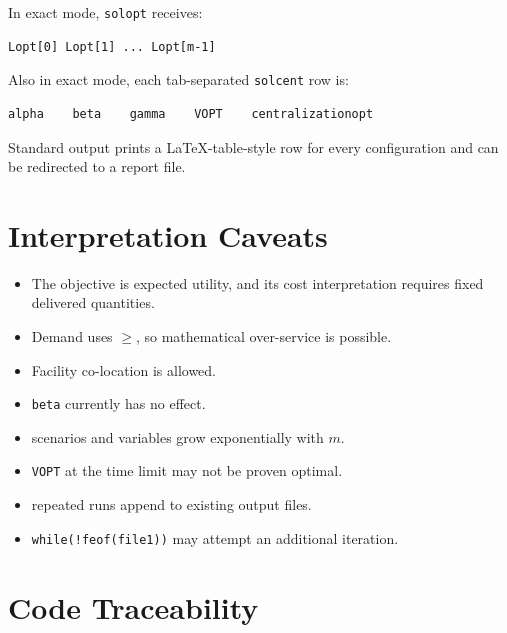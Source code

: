 \documentclass[11pt,a4paper]{article}
\newcommand{\code}[1]{\texttt{#1}}
\begin{document}
In exact mode, \code{solopt} receives:
\begin{lstlisting}
Lopt[0] Lopt[1] ... Lopt[m-1]
\end{lstlisting}

Also in exact mode, each tab-separated \code{solcent} row is:
\begin{lstlisting}
alpha    beta    gamma    VOPT    centralizationopt
\end{lstlisting}

Standard output prints a LaTeX-table-style row for every configuration and
can be redirected to a report file.

\section{Interpretation Caveats}

\begin{itemize}
\item The objective is expected utility, and its cost interpretation requires
fixed delivered quantities.
\item Demand uses $\geq$, so mathematical over-service is possible.
\item Facility co-location is allowed.
\item \code{beta} currently has no effect.
\item scenarios and variables grow exponentially with $m$.
\item \code{VOPT} at the time limit may not be proven optimal.
\item repeated runs append to existing output files.
\item \code{while(!feof(file1))} may attempt an additional iteration.
\end{itemize}

\section{Code Traceability}
\end{document}
